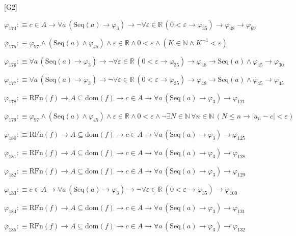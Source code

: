 \begin{fullproof}{[G2]}
\begin{abbrevlist}
\item $\varphi_{174} :\equiv c \in A \to \forall a\,(\mathrm{Seq}(a) \to \varphi_{3}) \to \neg \forall \varepsilon \in \mathbb{R}\,(0 < \varepsilon \to \varphi_{35}) \to \varphi_{48} \to \varphi_{69}$
\item $\varphi_{175} :\equiv \varphi_{97} \land (\mathrm{Seq}(a) \land \varphi_{45}) \land \varepsilon \in \mathbb{R} \land 0 < \varepsilon \land (K \in \mathbb{N} \land \underline{K}^{-1} < \varepsilon)$
\item $\varphi_{176} :\equiv \forall a\,(\mathrm{Seq}(a) \to \varphi_{3}) \to \neg \forall \varepsilon \in \mathbb{R}\,(0 < \varepsilon \to \varphi_{35}) \to \varphi_{48} \to \mathrm{Seq}(a) \land \varphi_{45} \to \varphi_{30}$
\item $\varphi_{177} :\equiv \forall a\,(\mathrm{Seq}(a) \to \varphi_{3}) \to \neg \forall \varepsilon \in \mathbb{R}\,(0 < \varepsilon \to \varphi_{35}) \to \varphi_{48} \to \mathrm{Seq}(a) \land \varphi_{45} \to \varphi_{45}$
\item $\varphi_{178} :\equiv \mathrm{RFn}(f) \to A \subseteq \mathrm{dom}(f) \to c \in A \to \forall a\,(\mathrm{Seq}(a) \to \varphi_{3}) \to \varphi_{121}$
\item $\varphi_{179} :\equiv \varphi_{97} \land (\mathrm{Seq}(a) \land \varphi_{45}) \land \varepsilon \in \mathbb{R} \land 0 < \varepsilon \land \neg \exists N \in \mathbb{N}\,\forall n \in \mathbb{N}\,(N \leq n \to \lvert a_{n} - c \rvert < \varepsilon)$
\item $\varphi_{180} :\equiv \mathrm{RFn}(f) \to A \subseteq \mathrm{dom}(f) \to c \in A \to \forall a\,(\mathrm{Seq}(a) \to \varphi_{3}) \to \varphi_{125}$
\item $\varphi_{181} :\equiv \mathrm{RFn}(f) \to A \subseteq \mathrm{dom}(f) \to c \in A \to \forall a\,(\mathrm{Seq}(a) \to \varphi_{3}) \to \varphi_{128}$
\item $\varphi_{182} :\equiv \mathrm{RFn}(f) \to A \subseteq \mathrm{dom}(f) \to c \in A \to \forall a\,(\mathrm{Seq}(a) \to \varphi_{3}) \to \varphi_{129}$
\item $\varphi_{183} :\equiv c \in A \to \forall a\,(\mathrm{Seq}(a) \to \varphi_{3}) \to \neg \forall \varepsilon \in \mathbb{R}\,(0 < \varepsilon \to \varphi_{35}) \to \varphi_{100}$
\item $\varphi_{184} :\equiv \mathrm{RFn}(f) \to A \subseteq \mathrm{dom}(f) \to c \in A \to \forall a\,(\mathrm{Seq}(a) \to \varphi_{3}) \to \varphi_{131}$
\item $\varphi_{185} :\equiv \mathrm{RFn}(f) \to A \subseteq \mathrm{dom}(f) \to c \in A \to \forall a\,(\mathrm{Seq}(a) \to \varphi_{3}) \to \varphi_{132}$

\end{abbrevlist}
\end{fullproof}
